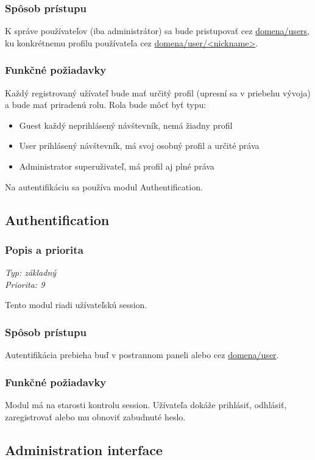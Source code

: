 \documentclass[a4paper,titlepage,11pt]{article}
\begin{document}
\subsubsection{Spôsob prístupu}
K správe používateľov (iba administrátor) sa bude pristupovať cez \url{domena/users}, ku konkrétnemu profilu používateľa cez \url{domena/user/<nickname>}.
\subsubsection{Funkčné požiadavky}
Každý registrovaný užívateľ bude mať určitý profil (upresní sa v priebehu vývoja) a bude mať priradenú rolu. 
Rola bude môcť byť typu:
\begin{itemize}
 \item Guest
  \subitem každý neprihlásený návštevník, nemá žiadny profil
 \item User
  \subitem prihlásený návštevník, má svoj osobný profil a určité práva
 \item Administrator
  \subitem superuživateľ, má profil aj plné práva
\end{itemize}
Na autentifikáciu sa používa modul Authentification.

\subsection{Authentification}
\subsubsection{Popis a priorita}
\begin{flushleft}
 \emph{Typ: základný}\\
 \emph{Priorita: 9}\\
\end{flushleft}
Tento modul riadi užívateľskú session. 
\subsubsection{Spôsob prístupu}
Autentifikácia prebieha buď v postrannom paneli alebo cez \url{domena/user}.
\subsubsection{Funkčné požiadavky}
Modul má na starosti kontrolu session. Užívateľa dokáže prihlásiť, odhlásiť, zaregistrovať alebo mu obnoviť zabudnuté heslo.

\subsection{Administration interface}
\end{document}
